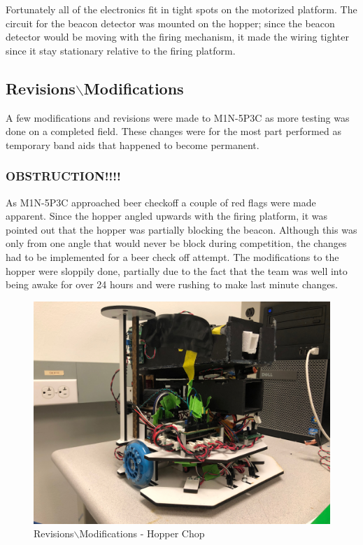 \documentclass{article}
\begin{document}
Fortunately all of the electronics fit in tight spots on the motorized platform. The circuit for the beacon detector was mounted on the hopper; since the beacon detector would be moving with the firing mechanism, it made the wiring tighter since it stay stationary relative to the firing platform.

\subsection{Revisions$\backslash{}$Modifications}
A few modifications and revisions were made to M1N-5P3C as more testing was done on a completed field. These changes were for the most part performed as temporary band aids that happened to become permanent.

\subsubsection{OBSTRUCTION!!!!}
As M1N-5P3C approached beer checkoff a couple of red flags were made apparent. Since the hopper angled upwards with the firing platform, it was pointed out that the hopper was partially blocking the beacon. Although this was only from one angle that would never be block during competition, the changes had to be implemented for a beer check off attempt. The modifications to the hopper were sloppily done, partially due to the fact that the team was well into being awake for over 24 hours and were rushing to make last minute changes.

\begin{figure}[H]
    \centering
    \includegraphics[width = 6in]{Obstruction.JPG}
    \caption{Revisions$\backslash{}$Modifications - Hopper Chop}
    \label{fig:Obstruction}
\end{figure}
\end{document}
